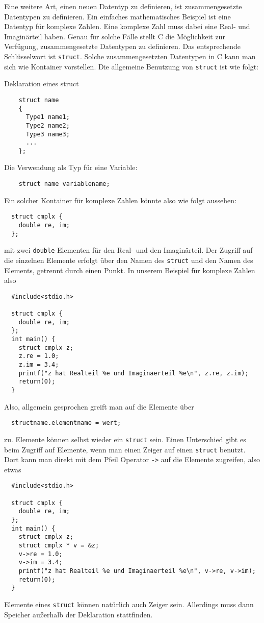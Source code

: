 Eine weitere Art, einen neuen Datentyp zu definieren, ist zusammengesetzte Datentypen zu definieren.
Ein einfaches mathematisches Beispiel ist eine Datentyp für komplexe Zahlen.
Eine komplexe Zahl muss dabei eine Real- und Imaginärteil haben.
Genau für solche Fälle stellt C die Möglichkeit zur Verfügung, zusammengesetzte Datentypen zu definieren.
Das entsprechende Schlüsselwort ist \verb|struct|.
Solche zusammengesetzten Datentypen in C kann man sich wie Kontainer vorstellen.
Die allgemeine Benutzung von \verb|struct| ist wie folgt:
\begin{myalertblock}{Deklaration eines struct}
  \begin{lstlisting}
    struct name
    {
      Type1 name1;
      Type2 name2;
      Type3 name3;
      ...
    };
  \end{lstlisting}
  \vspace{-0.4cm}
  Die Verwendung als Typ für eine Variable:
  \begin{lstlisting}
    struct name variablename;
  \end{lstlisting}
  \vspace{-0.4cm} 
\end{myalertblock}
Ein solcher Kontainer für komplexe Zahlen könnte also wie folgt aussehen:
\begin{lstlisting}
  struct cmplx {
    double re, im;
  };
\end{lstlisting}
mit zwei \verb|double| Elementen für den Real- und den Imaginärteil. 
Der Zugriff auf die einzelnen Elemente erfolgt über den Namen des \verb|struct| und den Namen des Elements, getrennt durch einen Punkt.
In unserem Beispiel für komplexe Zahlen also 
\begin{lstlisting}
  #include<stdio.h>

  struct cmplx {
    double re, im;
  };
  int main() {
    struct cmplx z;
    z.re = 1.0;
    z.im = 3.4;
    printf("z hat Realteil %e und Imaginaerteil %e\n", z.re, z.im);
    return(0);
  }
\end{lstlisting}
Also, allgemein gesprochen greift man auf die Elemente über 
\begin{lstlisting}
  structname.elementname = wert;
\end{lstlisting}
zu.
Elemente können selbst wieder ein \verb|struct| sein.
Einen Unterschied gibt es beim Zugriff auf Elemente, wenn man einen Zeiger auf einen \verb|struct| benutzt.
Dort kann man direkt mit dem Pfeil Operator \verb|->| auf die Elemente zugreifen, also etwas
\begin{lstlisting}
  #include<stdio.h>

  struct cmplx {
    double re, im;
  };
  int main() {
    struct cmplx z;
    struct cmplx * v = &z;
    v->re = 1.0;
    v->im = 3.4;
    printf("z hat Realteil %e und Imaginaerteil %e\n", v->re, v->im);
    return(0);
  }
\end{lstlisting}
Elemente eines \verb|struct| können natürlich auch Zeiger sein.
Allerdings muss dann Speicher außerhalb der Deklaration stattfinden.

